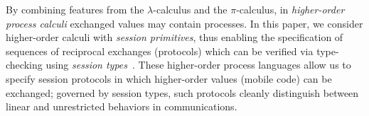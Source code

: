 
%

%

\noi 
By combining features from the $\lambda$-calculus and the $\pi$-calculus, 
in \emph{higher-order process calculi} exchanged values may contain  processes. 
In this paper, we consider higher-order calculi with \emph{session primitives},
thus enabling the specification of sequences of reciprocal exchanges (protocols)
which can be verified via type-checking using \emph{session types}~\cite{honda.vasconcelos.kubo:language-primitives}.
These higher-order process languages allow us to specify   
session protocols in which higher-order values 
(mobile code) can be exchanged; governed by session types, 
such protocols cleanly distinguish between 
linear and unrestricted behaviors in 
communications.


